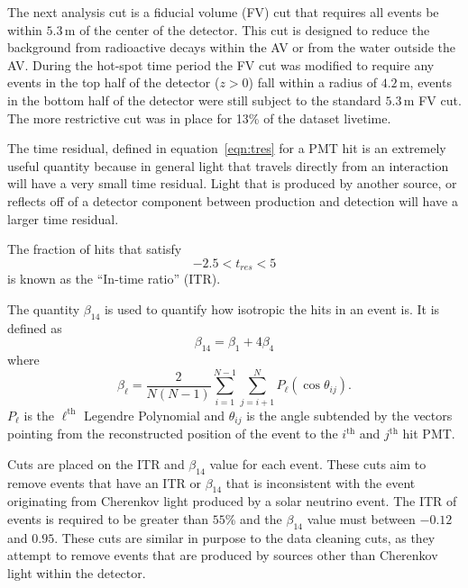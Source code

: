 The next analysis cut is a fiducial volume (FV) cut that requires all events
be within $5.3$\,m of the center of the detector.
This cut is designed to reduce the background from radioactive decays within
the AV or from the water outside the AV\@.
During the hot-spot time period the FV cut was modified to require any events in the
top half of the detector ($z > 0$) fall within a radius of $4.2$\,m,
events in the bottom half of the detector were still subject to the standard
$5.3$\,m FV cut.
The more restrictive cut was in place for 13\% of the dataset livetime.

The time residual, defined in equation~\ref{eqn:tres} for a PMT hit is an extremely
useful quantity because in general light that travels directly from an
interaction will have a very small time residual.
Light that is produced by another source, or reflects off of a detector component
between production and detection will have a larger time residual.


The fraction of hits that satisfy
\begin{equation}
    -2.5 < t_{res} < 5
\end{equation}
is known as the ``In-time ratio'' (ITR).

The quantity $\beta_{14}$ is used to quantify how isotropic the hits
in an event is. It is defined as
\begin{equation}
    \beta_{14} = \beta_{1} + 4\beta_{4}
\end{equation}
where
\begin{equation}
\beta_{\ell} = \frac{2}{N(N-1)}\sum_{i=1}^{N-1}\sum_{j=i+1}^{N}P_{\ell}(\cos\theta_{ij})\text{.}
\end{equation}
$P_{\ell}$ is the $\ell^{\text{th}}$ Legendre Polynomial and
$\theta_{ij}$ is the angle subtended by the vectors pointing
from the reconstructed position of the event to the $i^{\text{th}}$ and
$j^{\text{th}}$ hit PMT\@.

Cuts are placed on the ITR and $\beta_{14}$ value for each event.
These cuts aim to remove events
that have an ITR or $\beta_{14}$ 
that is inconsistent with the event originating from Cherenkov light produced
by a solar neutrino event.
The ITR of events is required to be greater than $55$\% and the $\beta_{14}$
value must between $-0.12$ and $0.95$.
These cuts are similar in purpose to the data cleaning cuts, as they attempt to
remove events that are produced by sources other than Cherenkov light within
the detector.

